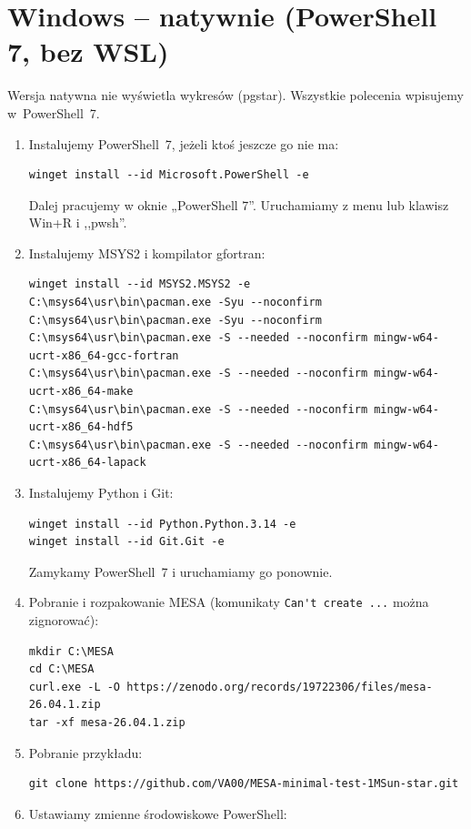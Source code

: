 \documentclass[11pt,a4paper]{article}
\begin{document}
\section{Windows -- natywnie (PowerShell 7, bez WSL)}\label{sec:win}

Wersja natywna nie wyświetla wykresów (pgstar). Wszystkie polecenia wpisujemy w~PowerShell~7.

\begin{enumerate}
\item Instalujemy PowerShell~7, jeżeli ktoś jeszcze go nie ma:
\begin{verbatim}
winget install --id Microsoft.PowerShell -e
\end{verbatim}
  Dalej pracujemy w oknie „PowerShell 7”. Uruchamiamy z menu lub klawisz Win+R i ,,pwsh''. 
\item Instalujemy MSYS2 i kompilator gfortran:
\begin{footnotesize}
\begin{verbatim}
winget install --id MSYS2.MSYS2 -e
C:\msys64\usr\bin\pacman.exe -Syu --noconfirm
C:\msys64\usr\bin\pacman.exe -Syu --noconfirm
C:\msys64\usr\bin\pacman.exe -S --needed --noconfirm mingw-w64-ucrt-x86_64-gcc-fortran
C:\msys64\usr\bin\pacman.exe -S --needed --noconfirm mingw-w64-ucrt-x86_64-make
C:\msys64\usr\bin\pacman.exe -S --needed --noconfirm mingw-w64-ucrt-x86_64-hdf5
C:\msys64\usr\bin\pacman.exe -S --needed --noconfirm mingw-w64-ucrt-x86_64-lapack
\end{verbatim}
\end{footnotesize}
\item Instalujemy Python i Git:
\begin{verbatim}
winget install --id Python.Python.3.14 -e
winget install --id Git.Git -e
\end{verbatim}
Zamykamy PowerShell~7 i uruchamiamy go ponownie.
\item Pobranie i rozpakowanie MESA (komunikaty \verb!Can't create ...! można zignorować):
\begin{verbatim}
mkdir C:\MESA
cd C:\MESA
curl.exe -L -O https://zenodo.org/records/19722306/files/mesa-26.04.1.zip
tar -xf mesa-26.04.1.zip
\end{verbatim}
\item Pobranie przykładu:
\begin{verbatim}
git clone https://github.com/VA00/MESA-minimal-test-1MSun-star.git
\end{verbatim}
\item Ustawiamy zmienne środowiskowe PowerShell:

\end{enumerate}
\end{document}

